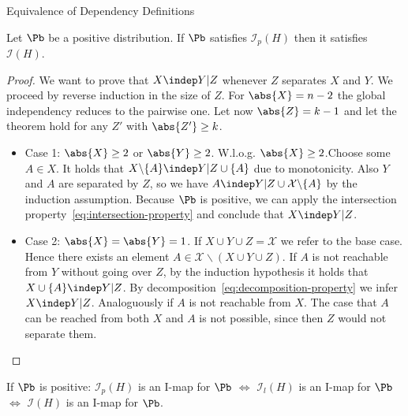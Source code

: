 \begin{frame}{Equivalence of Dependency Definitions}
\begin{theorem}
Let $\Pb$ be a positive distribution. 
If $\Pb$ satisfies $\mathcal{I}_p(H)$ then it satisfies $\mathcal{I}(H)$.
\end{theorem}
\pause
\begin{proof}
    We want to prove that $X \indep Y | Z$ whenever $Z$ separates $X$ and $Y$.
    We proceed by reverse induction in the size of $Z$.
    \pause
    For $\abs{X} = n-2$ the global independency reduces to the pairwise one.
    \pause 
    Let now $\abs{Z} = k-1$ and let the theorem hold for any $Z'$ with $\abs{Z'} \geq k$.
    \pause
    \begin{itemize}
    \item Case 1: $\abs{X} \geq 2$ or $\abs{Y} \geq 2$. 
    \pause W.l.o.g. $\abs{X} \geq 2$.Choose some $A \in X$.
    It holds that $X \backslash \{A\} \indep Y | Z \cup \{A\}$ due to monotonicity.
    Also $Y$ and $A$ are separated by $Z$, so we have $A \indep Y | Z \cup \mathcal{X} \backslash \{A\}$ by the induction assumption.
    \pause
    Because $\Pb$ is positive, we can apply the intersection property~\eqref{eq:intersection-property} and conclude that
    $X \indep Y | Z$.
    \pause \item Case 2: $\abs{X} = \abs{Y} = 1$.
    \pause
    If $X \cup Y \cup Z = \mathcal{X}$ we refer to the base case.
    \pause Hence there exists an element $A \in \mathcal{X} \backslash (X \cup Y \cup Z)$. 
    \pause If $A$ is not reachable from $Y$ without going over $Z$, by the induction hypothesis it holds that $X \cup \{A\} \indep Y | Z$. By decomposition~\eqref{eq:decomposition-property} we infer $X \indep Y | Z$.
    \pause Analoguously if $A$ is not reachable from $X$.
    \pause The case that $A$ can be reached from both $X$ and $A$ is not possible, since then $Z$ would not separate them.
    \end{itemize}
\end{proof}
\pause
\begin{corollary}
    If $\Pb$ is positive: 
        $\mathcal{I}_p(H)$ is an I-map for $\Pb$
        $\Leftrightarrow$
        $\mathcal{I}_l(H)$ is an I-map for $\Pb$
        $\Leftrightarrow$
        $\mathcal{I}(H)$ is an I-map for $\Pb$.
\end{corollary}
\end{frame}



